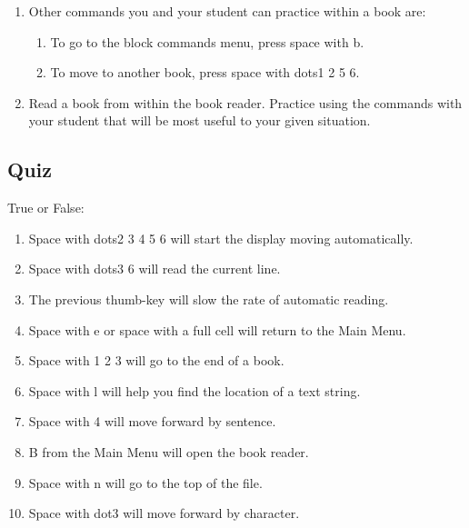 \documentclass[10pt,letterpaper,twoside]{report}
\begin{document}
{{{\begin{enumerate}
\begin{enumerate}
		      \item Use the back thumb-key to move back by one Braille display width.  Use the advance thumb-key to move forward by one Braille display width.
		      \item To start the display moving automatically, press space with dots1 2 4 5 6.  Press the previous thumb-key to slow down the speed of automatic reading.  The next thumb-key will increase the rate of automatic reading.
		      \item To stop automatic reading, pres the previous and next thumb-keys at the same time.
		      \item For more thumb-key commands, visit the help menu from within a book.
	      \end{enumerate}
	\item Other commands you and your student can practice within a book are:
	      \begin{enumerate}
		      \item To go to the block commands menu, press space with b.
		      \item To move to another book, press space with dots1 2 5 6.
	      \end{enumerate}
	\item Read a book from within the book reader.  Practice using the commands with your student that will be most useful to your given situation.
\end{enumerate}
\clearpage
\subsection{Quiz}
True or False:
\begin{enumerate}
	\item Space with dots2 3 4 5 6 will start the display moving automatically.
	\item Space with dots3 6 will read the current line.
	\item The previous thumb-key will slow the rate of automatic reading.
	\item Space with e or space with a full cell will return to the Main Menu.
	\item Space with 1 2 3 will go to the end of a book.
	\item Space with l will help you find the location of a text string.
	\item Space with 4 will move forward by sentence.
	\item B from the Main Menu will open the book reader.
	\item Space with n will go to the top of the file.
	\item Space with dot3 will move forward by character.
\end{enumerate}
\clearpage
}}}
\end{document}
